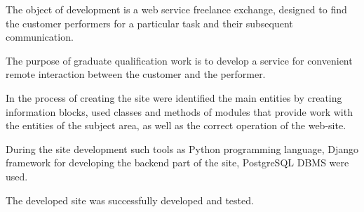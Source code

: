The object of development is a web service freelance exchange, designed to find the customer performers for a particular task and their subsequent communication.

The purpose of graduate qualification work is to develop a service for convenient remote interaction between the customer and the performer.

In the process of creating the site were identified the main entities by creating information blocks, used classes and methods of modules that provide work with the entities of the subject area, as well as the correct operation of the web-site.

During the site development such tools as Python programming language, Django framework for developing the backend part of the site, PostgreSQL DBMS were used.

The developed site was successfully developed and tested.

